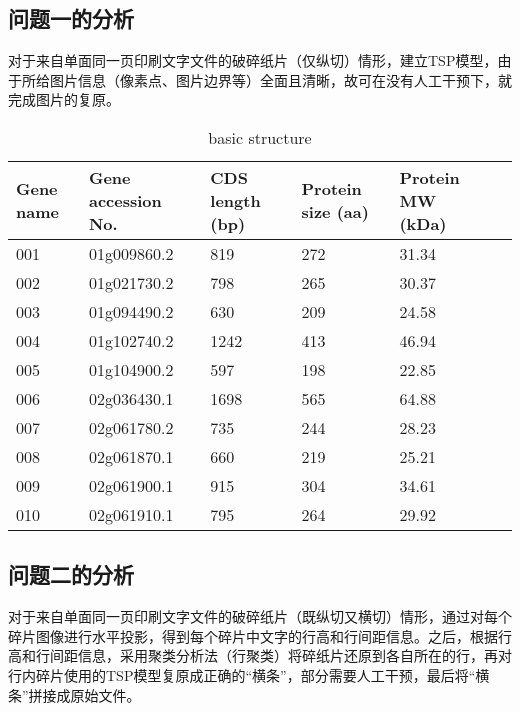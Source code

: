 \documentclass[12pt]{article}
\begin{document}
{       \subsection{问题一的分析}
       对于来自单面同一页印刷文字文件的破碎纸片（仅纵切）情形，建立TSP模型，由于所给图片信息（像素点、图片边界等）全面且清晰，故可在没有人工干预下，就完成图片的复原。
           \begin{table}[H]        
            \setlength{\abovecaptionskip}{-5mm}
            \setlength{\belowcaptionskip}{-3mm}
            \caption{\heiti{}basic structure}
            \vspace{20pt}
            \centering
            \begin{tabular}{p{2cm}p{3cm}p{2.5cm}p{2.5cm}p{2.5cm}p{2.5cm}}
                \hline
                Gene name & Gene accession No. & CDS length (bp) & Protein size (aa) & Protein MW (kDa) \\
                \hline
                001  & 01g009860.2   & 819             & 272               & 31.34            \\
                002  & 01g021730.2   & 798             & 265               & 30.37            \\
                003  & 01g094490.2   & 630             & 209               & 24.58            \\
                004  & 01g102740.2   & 1242            & 413               & 46.94            \\
                005  & 01g104900.2   & 597             & 198               & 22.85            \\
                006  & 02g036430.1   & 1698            & 565               & 64.88            \\
                007  & 02g061780.2   & 735             & 244               & 28.23            \\
                008  & 02g061870.1   & 660             & 219               & 25.21            \\
                009  & 02g061900.1   & 915             & 304               & 34.61            \\
                010  & 02g061910.1   & 795             & 264               & 29.92 \\    
                \hline       
            \end{tabular}
            \label{bs2}
        \end{table}
         
       \subsection{问题二的分析}
       对于来自单面同一页印刷文字文件的破碎纸片（既纵切又横切）情形，通过对每个碎片图像进行水平投影，得到每个碎片中文字的行高和行间距信息。之后，根据行高和行间距信息，采用聚类分析法（行聚类）将碎纸片还原到各自所在的行，再对行内碎片使用的TSP模型复原成正确的“横条”，部分需要人工干预，最后将“横条”拼接成原始文件。
       
}
\end{document}
